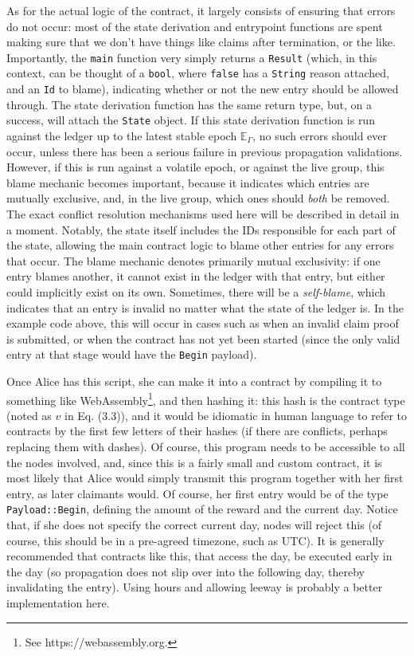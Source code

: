 \documentclass{extreport}
\begin{document}
As for the actual logic of the contract, it largely consists of ensuring that errors do not occur: most of the state derivation and entrypoint functions are spent making sure that we don't have things like claims after termination, or the like. Importantly, the \texttt{main} function very simply returns a \texttt{Result} (which, in this context, can be thought of a \texttt{bool}, where \texttt{false} has a \texttt{String} reason attached, and an \texttt{Id} to blame), indicating whether or not the new entry should be allowed through. The state derivation function has the same return type, but, on a success, will attach the \texttt{State} object. If this state derivation function is run against the ledger up to the latest stable epoch \(\mathbb{E}_\Gamma\), no such errors should ever occur, unless there has been a serious failure in previous propagation validations. However, if this is run against a volatile epoch, or against the live group, this blame mechanic becomes important, because it indicates which entries are mutually exclusive, and, in the live group, which ones should \emph{both} be removed. The exact conflict resolution mechanisms used here will be described in detail in a moment. Notably, the state itself includes the IDs responsible for each part of the state, allowing the main contract logic to blame other entries for any errors that occur. The blame mechanic denotes primarily mutual exclusivity: if one entry blames another, it cannot exist in the ledger with that entry, but either could implicitly exist on its own. Sometimes, there will be a \emph{self-blame}, which indicates that an entry is invalid no matter what the state of the ledger is. In the example code above, this will occur in cases such as when an invalid claim proof is submitted, or when the contract has not yet been started (since the only valid entry at that stage would have the \texttt{Begin} payload).

Once Alice has this script, she can make it into a contract by compiling it to something like WebAssembly\footnote{See https://webassembly.org.}, and then hashing it: this hash is the contract type (noted as \(v\) in Eq. (3.3)), and it would be idiomatic in human language to refer to contracts by the first few letters of their hashes (if there are conflicts, perhaps replacing them with dashes). Of course, this program needs to be accessible to all the nodes involved, and, since this is a fairly small and custom contract, it is most likely that Alice would simply transmit this program together with her first entry, as later claimants would. Of course, her first entry would be of the type \texttt{Payload::Begin}, defining the amount of the reward and the current day. Notice that, if she does not specify the correct current day, nodes will reject this (of course, this should be in a pre-agreed timezone, such as UTC). It is generally recommended that contracts like this, that access the day, be executed early in the day (so propagation does not slip over into the following day, thereby invalidating the entry). Using hours and allowing leeway is probably a better implementation here.
\end{document}
